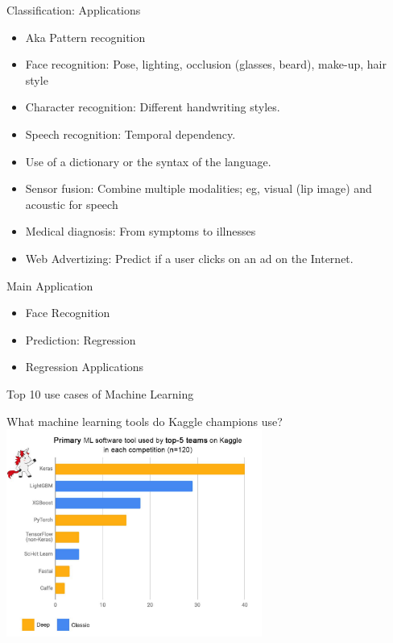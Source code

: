 \documentclass{beamer}
\begin{document}
\begin{frame}{Classification: Applications}
    \begin{itemize}
        \item Aka Pattern recognition
\item Face recognition: Pose, lighting, occlusion (glasses, beard), make-up, hair style 
\item Character recognition: Different handwriting styles.
\item Speech recognition: Temporal dependency. 
\item Use of a dictionary or the syntax of the language. 
\item Sensor fusion: Combine multiple modalities; eg, visual (lip image) and acoustic for speech
\item Medical diagnosis: From symptoms to illnesses
\item Web Advertizing: Predict if a user clicks on an ad on the Internet.
\end{itemize}
\end{frame}

\begin{frame}{Main Application}
    \begin{itemize}
        \item Face Recognition
        \item Prediction: Regression
        \item Regression Applications
    \end{itemize}
\end{frame}

\begin{frame}{Top 10 use cases of Machine Learning}

\end{frame}

\begin{frame}{What machine learning tools do Kaggle champions use?}
 \includegraphics[height=6.8cm]{D3Pb_Q3UIAAuSWU.jpg}
\centering   
\end{frame}
\end{document}
